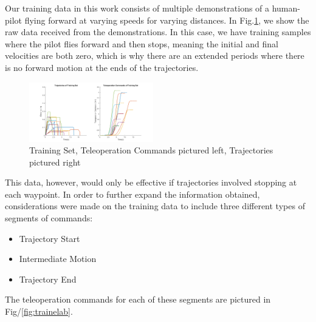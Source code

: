 \documentclass[letterpaper, 10 pt, conference]{ieeeconf}  %
\begin{document}
Our training data in this work consists of multiple demonstrations of a human-pilot flying forward at varying speeds for varying distances. In Fig.\ref{fig:train}, we show the raw data received from the demonstrations. In this case, we have training samples where the pilot flies forward and then stops, meaning the initial and final velocities are both zero, which is why there are an extended periods where there is no forward motion at the ends of the trajectories.

\begin{figure}[ht]
    \includegraphics[width=0.48\textwidth]{images/training.png}
    \caption{Training Set, Teleoperation Commands pictured left, Trajectories pictured right}
    \label{fig:train}
\end{figure}

This data, however, would only be effective if trajectories involved stopping at each waypoint. In order to further expand the information obtained, considerations were made on the training data to include three different types of segments of commands:

\begin{itemize}
\item Trajectory Start
\item Intermediate Motion
\item Trajectory End
\end{itemize}

The teleoperation commands for each of these segments are pictured in Fig/\ref{fig:trainelab}.
\end{document}
